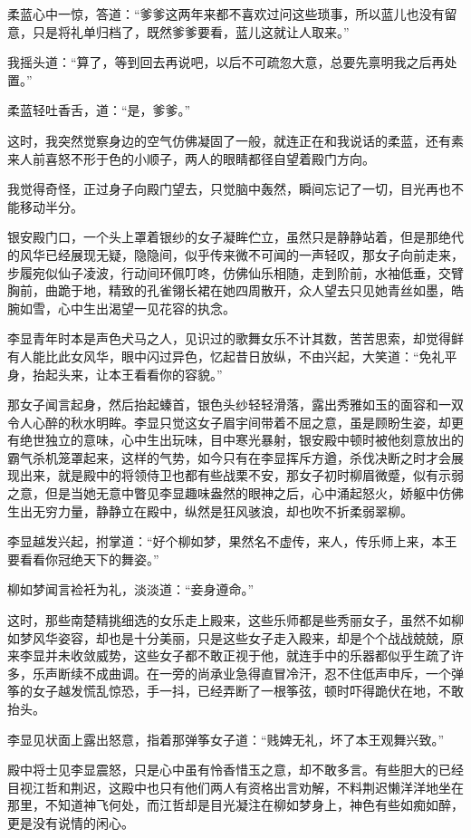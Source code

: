 柔蓝心中一惊，答道：“爹爹这两年来都不喜欢过问这些琐事，所以蓝儿也没有留意，只是将礼单归档了，既然爹爹要看，蓝儿这就让人取来。”

我摇头道：“算了，等到回去再说吧，以后不可疏忽大意，总要先禀明我之后再处置。”

柔蓝轻吐香舌，道：“是，爹爹。”

这时，我突然觉察身边的空气仿佛凝固了一般，就连正在和我说话的柔蓝，还有素来人前喜怒不形于色的小顺子，两人的眼睛都径自望着殿门方向。

我觉得奇怪，正过身子向殿门望去，只觉脑中轰然，瞬间忘记了一切，目光再也不能移动半分。

银安殿门口，一个头上罩着银纱的女子凝眸伫立，虽然只是静静站着，但是那绝代的风华已经展现无疑，隐隐间，似乎传来微不可闻的一声轻叹，那女子向前走来，步履宛似仙子凌波，行动间环佩叮咚，仿佛仙乐相随，走到阶前，水袖低垂，交臂胸前，曲跪于地，精致的孔雀翎长裙在她四周散开，众人望去只见她青丝如墨，皓腕如雪，心中生出渴望一见花容的执念。

李显青年时本是声色犬马之人，见识过的歌舞女乐不计其数，苦苦思索，却觉得鲜有人能比此女风华，眼中闪过异色，忆起昔日放纵，不由兴起，大笑道：“免礼平身，抬起头来，让本王看看你的容貌。”

那女子闻言起身，然后抬起螓首，银色头纱轻轻滑落，露出秀雅如玉的面容和一双令人心醉的秋水明眸。李显只觉这女子眉宇间带着不屈之意，虽是顾盼生姿，却更有绝世独立的意味，心中生出玩味，目中寒光暴射，银安殿中顿时被他刻意放出的霸气杀机笼罩起来，这样的气势，如今只有在李显挥斥方遒，杀伐决断之时才会展现出来，就是殿中的将领侍卫也都有些战栗不安，那女子初时柳眉微蹙，似有示弱之意，但是当她无意中瞥见李显趣味盎然的眼神之后，心中涌起怒火，娇躯中仿佛生出无穷力量，静静立在殿中，纵然是狂风骇浪，却也吹不折柔弱翠柳。

李显越发兴起，拊掌道：“好个柳如梦，果然名不虚传，来人，传乐师上来，本王要看看你冠绝天下的舞姿。”

柳如梦闻言裣衽为礼，淡淡道：“妾身遵命。”

这时，那些南楚精挑细选的女乐走上殿来，这些乐师都是些秀丽女子，虽然不如柳如梦风华姿容，却也是十分美丽，只是这些女子走入殿来，却是个个战战兢兢，原来李显并未收敛威势，这些女子都不敢正视于他，就连手中的乐器都似乎生疏了许多，乐声断续不成曲调。在一旁的尚承业急得直冒冷汗，忍不住低声申斥，一个弹筝的女子越发慌乱惊恐，手一抖，已经弄断了一根筝弦，顿时吓得跪伏在地，不敢抬头。

李显见状面上露出怒意，指着那弹筝女子道：“贱婢无礼，坏了本王观舞兴致。”

殿中将士见李显震怒，只是心中虽有怜香惜玉之意，却不敢多言。有些胆大的已经目视江哲和荆迟，这殿中也只有他们两人有资格出言劝解，不料荆迟懒洋洋地坐在那里，不知道神飞何处，而江哲却是目光凝注在柳如梦身上，神色有些如痴如醉，更是没有说情的闲心。

